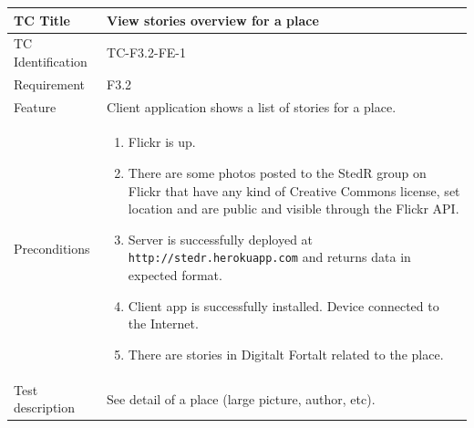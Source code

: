 \documentclass[11pt]{book}
\begin{document}
\begin{table}
  \begin{tabular}{| p{3cm} | p{9.5cm} |} \hline 
    TC Title              & View stories overview for a place \\ \hline 
    TC Identification     & TC-F3.2-FE-1 \\ \hline 
    Requirement           & F3.2 \\ \hline 
    Feature               & Client application shows a list of stories for a place. \\ \hline 
    Preconditions         & \begin{enumerate}
                              \item Flickr is up.
                              \item There are some photos posted to the StedR group on Flickr that have any kind of
                               Creative Commons license, set location and are public and visible through the Flickr API.
                              \item Server is successfully deployed at \texttt{http://stedr.herokuapp.com} and returns data in expected format.
                              \item Client app is successfully installed. Device connected to the Internet.
                              \item There are stories in Digitalt Fortalt related to the place.
                            \end{enumerate} \\ \hline 

    Test description      & See detail of a place (large picture, author, etc).


\end{tabular}
\end{table}
\end{document}
